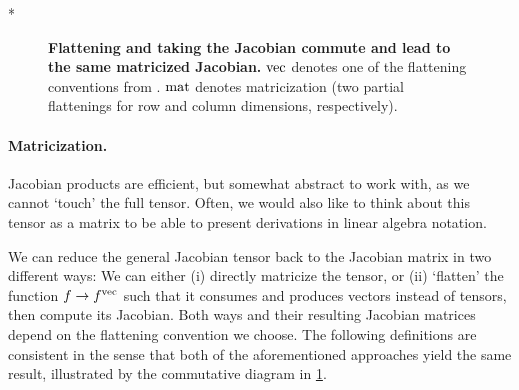 \switchcolumn[1]*
\begin{figure}[!h]
  \centering
  \caption{\textbf{Flattening and taking the Jacobian commute and lead to the same matricized Jacobian.}
    $\vec$ denotes one of the flattening conventions from .
    $\mat$ denotes matricization (two partial flattenings for row and column dimensions, respectively).}\label{fig:commutative-diagram-jacobian}
\end{figure}
\switchcolumn[0]

\paragraph{Matricization.}
Jacobian products are efficient, but somewhat abstract to work with, as we cannot `touch' the full tensor.
Often, we would also like to think about this tensor as a matrix to be able to present derivations in linear algebra notation.

We can reduce the general Jacobian tensor back to the Jacobian matrix in two different ways: We can either (i) directly matricize the tensor, or (ii) `flatten' the function $f \to f^{\vec}$ such that it consumes and produces vectors instead of tensors, then compute its Jacobian.
Both ways and their resulting Jacobian matrices depend on the flattening convention we choose.
The following definitions are consistent in the sense that both of the aforementioned approaches yield the same result, illustrated by the commutative diagram in \cref{fig:commutative-diagram-jacobian}.


